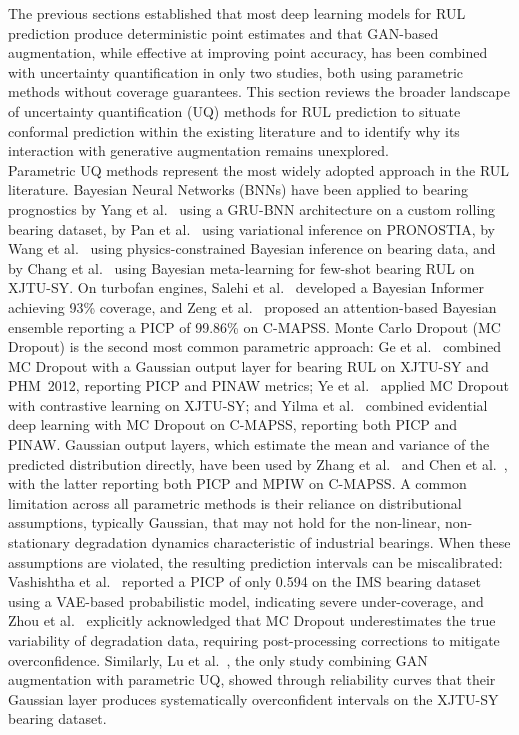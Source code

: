 \documentclass[review]{elsarticle}
\begin{document}
The previous sections established that most deep learning models for RUL
prediction produce deterministic point estimates and that
GAN-based augmentation, while effective at improving point accuracy,
has been combined with uncertainty quantification in only two studies,
both using parametric methods without coverage guarantees. This section
reviews the broader landscape of uncertainty quantification (UQ)
methods for RUL prediction to situate conformal prediction within the
existing literature and to identify why its interaction with generative
augmentation remains unexplored.\\

Parametric UQ methods represent the most widely adopted approach in
the RUL literature. Bayesian Neural Networks (BNNs) have been applied
to bearing prognostics by Yang et al.~\cite{10854686} using a
GRU-BNN architecture on a custom rolling bearing dataset, by
Pan et al.~\cite{pan_two-stage_2025} using variational inference on
PRONOSTIA, by Wang et al.~\cite{wang_physics-constrained_2026} using
physics-constrained Bayesian inference on bearing data, and by
Chang et al.~\cite{chang_few-shot_2025} using Bayesian
meta-learning for few-shot bearing RUL on XJTU-SY. On turbofan
engines, Salehi et al.~\cite{salehi_bayesian_2026} developed a
Bayesian Informer achieving 93\% coverage, and
Zeng et al.~\cite{zeng_2026} proposed an attention-based Bayesian
ensemble reporting a PICP of 99.86\% on C-MAPSS. Monte Carlo Dropout
(MC Dropout) is the second most common parametric approach:
Ge et al.~\cite{ge_bearing_2025} combined MC Dropout with a Gaussian
output layer for bearing RUL on XJTU-SY and PHM~2012, reporting PICP
and PINAW metrics;
Ye et al.~\cite{11131520} applied MC Dropout with contrastive
learning on XJTU-SY; and
Yilma et al.~\cite{yilma_deep_2026} combined evidential deep
learning with MC Dropout on C-MAPSS, reporting both PICP and PINAW.
Gaussian output layers, which estimate the mean and variance of the
predicted distribution directly, have been used by
Zhang et al.~\cite{11398369} and
Chen et al.~\cite{chen_probabilistic_2026}, with the latter
reporting both PICP and MPIW on C-MAPSS. A common limitation across
all parametric methods is their reliance on distributional
assumptions, typically Gaussian, that may not hold for the
non-linear, non-stationary degradation dynamics characteristic of
industrial bearings. When these assumptions are violated, the
resulting prediction intervals can be miscalibrated:
Vashishtha et al.~\cite{s26072230} reported a PICP of only 0.594
on the IMS bearing dataset using a VAE-based probabilistic model,
indicating severe under-coverage, and
Zhou et al.~\cite{zhou_self-attention_2026} explicitly acknowledged
that MC Dropout underestimates the true variability of degradation
data, requiring post-processing corrections to mitigate
overconfidence. Similarly, Lu et al.~\cite{lu_joint_2022}, the only
study combining GAN augmentation with parametric UQ, showed through
reliability curves that their Gaussian layer produces systematically
overconfident intervals on the XJTU-SY bearing dataset.\\
\end{document}
